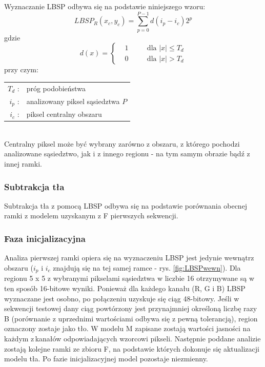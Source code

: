 Wyznaczanie LBSP odbywa się na podstawie niniejszego wzoru:
\begin{equation}
LBSP_{R}(x_{c},y_{c}) = 
\sum_{p=0}^{P-1}d(i_{p}-i_{c})2^p
\end{equation}
gdzie
\begin{equation}
d(x)=\left\{
\begin{split}
&1 & \quad &\text{dla $|x|\leq T_{d}$} \\
&0 & \quad &\text{dla $|x|>T_{d}$}
\end{split}
\right.
\end{equation}
przy czym:\\ 
\hspace*{3em}
\begin{tabular}{r l}
$T_{d}$ : &  próg podobieństwa\\
$i_{p}$ : & analizowany piksel sąsiedztwa $P$\\
$i_{c}$ : & piksel centralny obszaru\\
\end{tabular} \\

Centralny piksel może być wybrany zarówno z obszaru, z którego pochodzi analizowane sąsiedztwo, jak i z innego regionu - na tym samym obrazie bądź z innej ramki.
\subsubsection{Subtrakcja tła}
Subtrakcja tła z pomocą LBSP odbywa się na podstawie porównania obecnej ramki z modelem uzyskanym z F pierwszych sekwencji. 
\subsubsection{Faza inicjalizacyjna}
Analiza pierwszej ramki opiera się na wyznaczeniu LBSP  jest jedynie wewnątrz obszaru ($i_{p}$ i $i_{c}$ znajdują się na tej samej ramce - rys. \ref{fig:LBSPwewn}). Dla regionu 5 x 5 z wybranymi pikselami sąsiedztwa w liczbie 16 otrzymywane są w ten sposób 16-bitowe wyniki. Ponieważ dla każdego kanału (R, G i B) LBSP wyznaczane jest osobno, po połączeniu uzyskuje się ciąg 48-bitowy. Jeśli w sekwencji testowej dany ciąg powtórzony jest przynajmniej określoną liczbę razy B (porównanie z uprzednimi wartościami odbywa się z pewną tolerancją), region oznaczony zostaje jako tło. W modelu M zapisane zostają wartości jasności na każdym z\,kanałów odpowiadających wzorcowi pikseli. Następnie poddane analizie zostają kolejne ramki ze zbioru F, na podstawie których dokonuje się aktualizacji modelu tła. Po fazie inicjalizacyjnej model pozostaje niezmienny.
